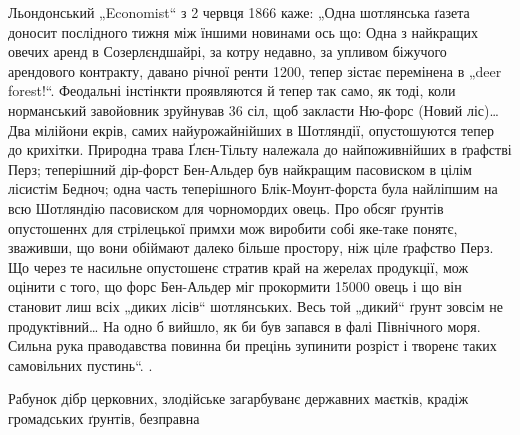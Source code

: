 {Льондонський „Economist“ з 2 червця 1866 каже: „Одна шотлянська ґазета доносит послідного тижня між
їншими новинами ось що: Одна з найкращих овечих аренд в Созерлєндшайрі, за котру недавно, за упливом
біжучого арендового контракту, давано річної ренти 1200, тепер зістає перемінена в
„deer forest!“. Феодальні інстінкти проявляются й тепер так само, як тоді, коли норманський
завойовник зруйнував 36 сіл, щоб закласти Ню-форс (Новий ліс)\dots{} Два мілійони екрів, самих
найурожайнійших в Шотляндії, опустошуются тепер до крихітки. Природна трава Ґлєн-Тільту належала до
найпоживнійших в ґрафстві Перз; теперішний дір-форст Бен-Альдер був найкращим пасовиском в цілім
лісистім Бедноч; одна часть теперішного Блік-Моунт-форста була найліпшим на всю Шотляндію пасовиском
для чорномордих овець. Про обсяг ґрунтів опустошеннх для стрілецької примхи мож виробити собі
яке-таке понятє, зваживши, що вони обіймают далеко більше простору, ніж ціле ґрафство Перз. Що через
те насильне опустошенє стратив край на жерелах продукції, мож оцінити с того, що форс Бен-Альдер міг
прокормити \num{15000} овець і що він становит лиш  всіх „диких лісів“ шотлянських.
Весь той „дикий“ ґрунт зовсім не продуктівний\dots{} На одно б вийшло, як би був запався в фалі
Північного моря. Сильна рука праводавства повинна би прецінь зупинити розріст і творенє таких
самовільних пустинь“.
}.

Рабунок дібр церковних, злодійське загарбуванє державних маєтків, крадіж громадських ґрунтів,
безправна \parbreak{}
